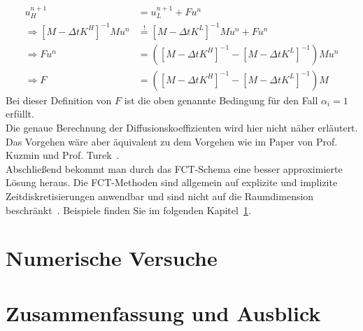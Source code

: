\documentclass[a4paper,11pt]{article}
\begin{document}
\begin{align}
 u_H^{n+1}&=u_L^{n+1} +Fu^n\\
\Rightarrow [M-\Delta tK^H]^{-1}Mu^n&\overset{!}{=}[M-\Delta tK^L]^{-1}Mu^n+Fu^n\\
\Rightarrow Fu^n&=([M-\Delta tK^H]^{-1}-[M-\Delta tK^L]^{-1})Mu^n\\
\Rightarrow F&=([M-\Delta tK^H]^{-1}-[M-\Delta tK^L]^{-1})M
\end{align}
Bei dieser Definition von $F$ ist die oben genannte Bedingung für den Fall $\alpha_i=1$ erfüllt.\\
Die genaue Berechnung der Diffusionskoeffizienten wird hier nicht näher erläutert. Das Vorgehen wäre aber äquivalent zu dem Vorgehen wie im Paper von Prof. Kuzmin und Prof. Turek~\cite{kuzmin2002flux}.\\
Abschließend bekommt man durch das FCT-Schema eine besser approximierte Lösung heraus. Die FCT-Methoden sind allgemein auf explizite und implizite Zeitdiskretisierungen anwendbar und sind nicht auf die Raumdimension beschränkt~\cite{kuzmin2002flux}. Beispiele finden Sie im folgenden Kapitel~\ref{sec:NumVers}.
\pagebreak
\section{Numerische Versuche}\label{sec:NumVers}
\pagebreak
\section{Zusammenfassung und Ausblick}
\pagebreak
{}
\appendix


\end{document}
